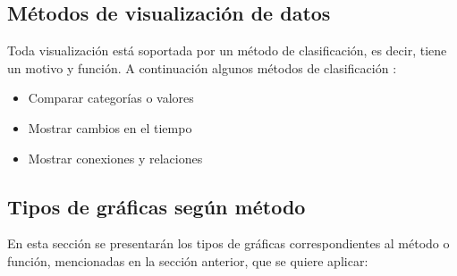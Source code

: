 \subsection{Métodos de visualización de datos}
Toda visualización está soportada por un método de clasificación, es decir, tiene un motivo y función. A continuación algunos métodos de clasificación \cite{DataVis}:

\begin{itemize}
    \item Comparar categorías o valores
    \item Mostrar cambios en el tiempo
    \item Mostrar conexiones y relaciones
\end{itemize}

\subsection{Tipos de gráficas según método}
En esta sección se presentarán los tipos de gráficas correspondientes al método o función, mencionadas en la sección anterior, que se quiere aplicar:

